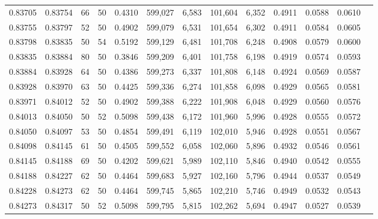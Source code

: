 \begin{tabular}{rrrrrrrrrrrrr}
0.83705 & 0.83754 &    66 &  50 &                                     0.4310 & 599,027 &   6,583 & 101,604 &   6,352 & 0.4911 & 0.0588 & 0.0610 \\
0.83755 & 0.83797 &    52 &  50 &                                     0.4902 & 599,079 &   6,531 & 101,654 &   6,302 & 0.4911 & 0.0584 & 0.0605 \\
0.83798 & 0.83835 &    50 &  54 &                                     0.5192 & 599,129 &   6,481 & 101,708 &   6,248 & 0.4908 & 0.0579 & 0.0600 \\
0.83835 & 0.83884 &    80 &  50 &                                     0.3846 & 599,209 &   6,401 & 101,758 &   6,198 & 0.4919 & 0.0574 & 0.0593 \\
0.83884 & 0.83928 &    64 &  50 &                                     0.4386 & 599,273 &   6,337 & 101,808 &   6,148 & 0.4924 & 0.0569 & 0.0587 \\
0.83928 & 0.83970 &    63 &  50 &                                     0.4425 & 599,336 &   6,274 & 101,858 &   6,098 & 0.4929 & 0.0565 & 0.0581 \\
0.83971 & 0.84012 &    52 &  50 &                                     0.4902 & 599,388 &   6,222 & 101,908 &   6,048 & 0.4929 & 0.0560 & 0.0576 \\
0.84013 & 0.84050 &    50 &  52 &                                     0.5098 & 599,438 &   6,172 & 101,960 &   5,996 & 0.4928 & 0.0555 & 0.0572 \\
0.84050 & 0.84097 &    53 &  50 &                                     0.4854 & 599,491 &   6,119 & 102,010 &   5,946 & 0.4928 & 0.0551 & 0.0567 \\
0.84098 & 0.84145 &    61 &  50 &                                     0.4505 & 599,552 &   6,058 & 102,060 &   5,896 & 0.4932 & 0.0546 & 0.0561 \\
0.84145 & 0.84188 &    69 &  50 &                                     0.4202 & 599,621 &   5,989 & 102,110 &   5,846 & 0.4940 & 0.0542 & 0.0555 \\
0.84188 & 0.84227 &    62 &  50 &                                     0.4464 & 599,683 &   5,927 & 102,160 &   5,796 & 0.4944 & 0.0537 & 0.0549 \\
0.84228 & 0.84273 &    62 &  50 &                                     0.4464 & 599,745 &   5,865 & 102,210 &   5,746 & 0.4949 & 0.0532 & 0.0543 \\
0.84273 & 0.84317 &    50 &  52 &                                     0.5098 & 599,795 &   5,815 & 102,262 &   5,694 & 0.4947 & 0.0527 & 0.0539 \\

\end{tabular}
